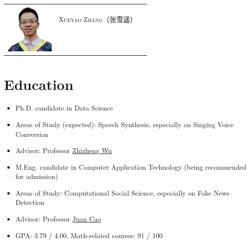 \documentclass{resume}
\begin{document}

\Large{
  \begin{tabu}{ c l l }
    & \scshape{Xueyao Zhang（张雪遥）} &  \\
    &  &  \\
    &  &  \\
    & 
    &  
  \end{tabu}
}

\section{Education}
{
  \small 
\begin{itemize}
  \item Ph.D. candidate in Data Science
  \item Areas of Study (expected): Speech Synthesis, especially on Singing Voice Conversion
  \item Advisor: Professor \href{https://scholar.google.com/citations?user=K6zhweAAAAAJ&hl=en}{Zhizheng Wu} 
\end{itemize}
}

{
  \small 
\begin{itemize}
  \item M.Eng. candidate in Computer Application Technology (being recommended for admission)
  \item Areas of Study: Computational Social Science, especially on Fake News Detection
  \item Advisor: Professor \href{https://scholar.google.com/citations?user=fSBdNg0AAAAJ&hl=zh-CN}{Juan Cao}
  \item GPA: 3.79 / 4.00, Math-related courses: 91 / 100
\end{itemize}
}
\end{document}
